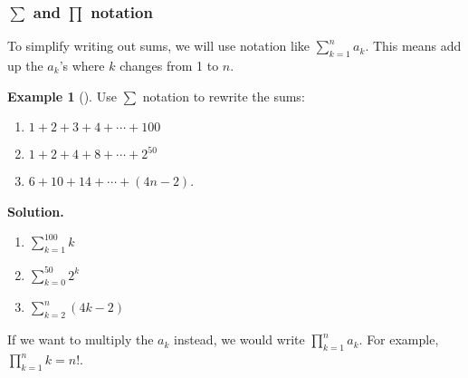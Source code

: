 \documentclass[12pt,]{book}
\theoremstyle{plain}
\theoremstyle{definition}
\theoremstyle{definition}
\newtheorem{example}[theorem]{Example}
\theoremstyle{definition}
\numberwithin{equation}{chapter}
\renewcommand{\d}{\displaystyle}
\begin{document}
\subsubsection[{\(\sum\) and \(\prod\) notation}]{\(\sum\) and \(\prod\) notation}\label{subsubsection-3}
\hypertarget{p-164}{}%
To simplify writing out sums, we will use notation like \(\d\sum_{k=1}^n a_k\). This means add up the \(a_k\)'s where \(k\) changes from 1 to \(n\).%
\begin{example}[]\label{example-13}
\hypertarget{p-165}{}%
Use \(\sum\) notation to rewrite the sums:%
\par
\hypertarget{p-166}{}%
\leavevmode%
\begin{enumerate}
\item\hypertarget{li-87}{}\(1 + 2 + 3 + 4 + \cdots + 100\)%
\item\hypertarget{li-88}{}\(1 + 2 + 4 + 8 + \cdots + 2^{50}\)%
\item\hypertarget{li-89}{}\(6 + 10 + 14 + \cdots + (4n - 2)\).%
\end{enumerate}
%
\par\smallskip%
\noindent\textbf{Solution.}\hypertarget{solution-15}{}\quad%
\hypertarget{p-167}{}%
\leavevmode%
\begin{enumerate}
\item\hypertarget{li-90}{}\(\d\sum_{k=1}^{100} k\)%
\item\hypertarget{li-91}{}\(\d\sum_{k=0}^{50} 2^k\)%
\item\hypertarget{li-92}{}\(\d\sum_{k=2}^{n} (4k -2)\)%
\end{enumerate}
%
\end{example}
\hypertarget{p-168}{}%
If we want to multiply the \(a_k\) instead, we would write \(\d\prod_{k=1}^n a_k\). For example, \(\d\prod_{k=1}^n k = n!\).%
\typeout{************************************************}
\typeout{************************************************}
\end{document}
